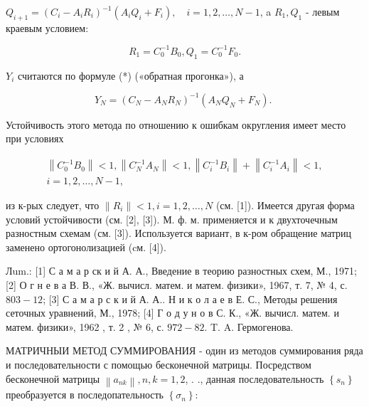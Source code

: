 \documentclass[10pt]{article}
\begin{document}
$Q_{i+1}=\left(C_{i}-A_{i} R_{i}\right)^{-1}\left(A_{i} Q_{i}+F_{i}\right), \quad i=1,2, \ldots, N-1$, a $R_{1}, Q_{1}$ - левым краевым условием:



\[

R_{1}=C_{0}^{-1} B_{0}, Q_{1}=C_{0}^{-1} F_{0} .

\]



$Y_{i}$ считаются по формуле (*) («обратная прогонка»), а



\[

Y_{N}=\left(C_{N}-A_{N} R_{N}\right)^{-1}\left(A_{N} Q_{N}+F_{N}\right) \text {. }

\]



Устойчивость этого метода по отношению к ошибкам округления имеет место при условиях



\[

\begin{gathered}

\left\|C_{0}^{-1} B_{0}\right\|<1,\left\|C_{N}^{-1} A_{N}\right\|<1,\left\|C_{i}^{-1} B_{i}\right\|+\left\|C_{i}^{-1} A_{i}\right\|<1, \\

i=1,2, \ldots, N-1,

\end{gathered}

\]



из к-рых следует, что $\left\|R_{i}\right\|<1, i=1,2, \ldots, N$ (см. [1]). Имеется другая форма условий устойчивости (см. [2], [3]). М. ф. м. применяется и к двухточечным разностным схемам (см. [3]). Используется вариант, в к-ром обращение матриц заменено ортогонолизацией (cм. [4]).



Лum.: [1] С а м а р ск и й А. А., Введение в теорию разностных схем, М., 1971; [2] О г н е в а В. В., «Ж. вычисл. матем. и матем. физики», 1967, т. 7, № 4, с. $803-12$; [3] С а м а р с к и й А. А.. Н и к о л а е в Е. С., Методы решения сеточных уравнений, М., 1978; [4] Г о д у н о в С. К., «Ж. вычисл. матем. и матем. физики», 1962 , т. 2 , № 6, с. $972-82$. T. A. Гермогенова.



МАТРИЧНЫИ МЕТОД СУММИРОВАНИЯ - один из методов суммирования ряда и последовательности с помощью бесконечной матрицы. Посредством бесконечной матрицы $\left\|a_{n k}\right\|, n, k=1,2$, . ., данная последовательность $\left\{s_{n}\right\}$ преобразуется в последопательность $\left\{\sigma_{n}\right\}:$
\end{document}
